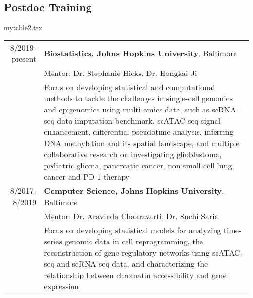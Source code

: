 \documentclass[10pt,letterpaper]{article}
\begin{document}
\subsection*{Postdoc Training}
\begin{filecontents}{mytable2.tex}
\begin{longtable}{rX}
8/2019-present & {\bf Biostatistics, Johns Hopkins University}, Baltimore\\
& Mentor: Dr. Stephanie Hicks, Dr. Hongkai Ji\\
& Focus on developing statistical and computational methods to tackle the challenges in single-cell genomics and epigenomics using multi-omics data, such as scRNA-seq data imputation benchmark, scATAC-seq signal enhancement, differential pseudotime analysis, inferring DNA methylation and its spatial landscape, and multiple collaborative research on investigating glioblastoma, pediatric glioma, pancreatic cancer, non-small-cell lung cancer and PD-1 therapy\\
 8/2017-8/2019 & {\bf Computer Science, Johns Hopkins University}, Baltimore\\
& Mentor:  Dr. Aravinda Chakravarti, Dr. Suchi Saria \\
& Focus on developing statistical models for analyzing time-series genomic data in cell reprogramming, the reconstruction of gene regulatory networks using scATAC-seq and scRNA-seq data, and characterizing the relationship between chromatin accessibility and gene expression\\
\end{longtable}
\end{filecontents}
\end{document}
